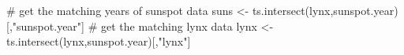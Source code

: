 \begin{Schunk}
\begin{Sinput}
 # get the matching years of sunspot data
 suns <- ts.intersect(lynx,sunspot.year)[,"sunspot.year"]
 # get the matching lynx data
 lynx <- ts.intersect(lynx,sunspot.year)[,"lynx"]
\end{Sinput}
\end{Schunk}

